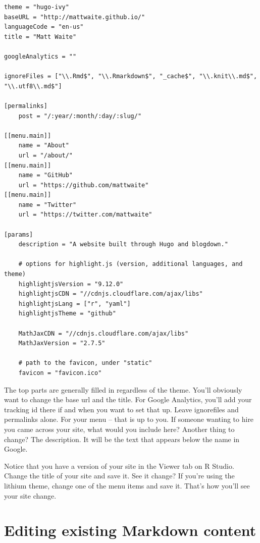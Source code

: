 \documentclass[
]{book}
\begin{document}
\begin{verbatim}
theme = "hugo-ivy"
baseURL = "http://mattwaite.github.io/"
languageCode = "en-us"
title = "Matt Waite"

googleAnalytics = ""

ignoreFiles = ["\\.Rmd$", "\\.Rmarkdown$", "_cache$", "\\.knit\\.md$", "\\.utf8\\.md$"]

[permalinks]
    post = "/:year/:month/:day/:slug/"

[[menu.main]]
    name = "About"
    url = "/about/"
[[menu.main]]
    name = "GitHub"
    url = "https://github.com/mattwaite"
[[menu.main]]
    name = "Twitter"
    url = "https://twitter.com/mattwaite"

[params]
    description = "A website built through Hugo and blogdown."

    # options for highlight.js (version, additional languages, and theme)
    highlightjsVersion = "9.12.0"
    highlightjsCDN = "//cdnjs.cloudflare.com/ajax/libs"
    highlightjsLang = ["r", "yaml"]
    highlightjsTheme = "github"

    MathJaxCDN = "//cdnjs.cloudflare.com/ajax/libs"
    MathJaxVersion = "2.7.5"

    # path to the favicon, under "static"
    favicon = "favicon.ico"
\end{verbatim}

The top parts are generally filled in regardless of the theme. You'll obviously want to change the base url and the title. For Google Analytics, you'll add your tracking id there if and when you want to set that up. Leave ignorefiles and permalinks alone. For your menu -- that is up to you. If someone wanting to hire you came across your site, what would you include here? Another thing to change? The description. It will be the text that appears below the name in Google.

Notice that you have a version of your site in the Viewer tab on R Studio. Change the title of your site and save it. See it change? If you're using the lithium theme, change one of the menu items and save it. That's how you'll see your site change.

\hypertarget{editing-existing-markdown-content}{%
\section{Editing existing Markdown content}\label{editing-existing-markdown-content}}
\end{document}

